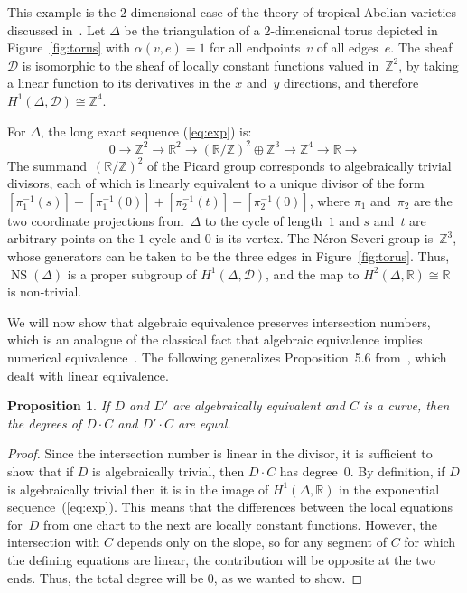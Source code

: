 \documentclass[11pt]{amsart}
\newtheorem{prop}[thm]{Proposition}
\theoremstyle{definition}
\newcommand{\cD}{\mathcal D}
\newcommand{\isom}{\cong}
\newcommand{\NS}{\operatorname{NS}}
\newcommand{\RR}{\mathbb R}
\newcommand{\ZZ}{\mathbb Z}
\begin{document}
\begin{ex}\label{ex:torus}
This example is the $2$-dimensional case of the theory of tropical Abelian
varieties discussed in~\cite[Section~5.1]{mikhalkin-zharkov}.
Let $\Delta$ be the triangulation of a $2$-dimensional torus depicted in
Figure~\ref{fig:torus} with $\alpha(v,e) = 1$ for all endpoints~$v$ of all
edges~$e$. The sheaf $\cD$ is isomorphic to the sheaf of locally constant
functions valued in~$\ZZ^2$, by taking a linear function to its
derivatives in the $x$ and~$y$ directions, and therefore $H^1(\Delta, \cD) \isom
\ZZ^4$.

For $\Delta$, the long exact sequence (\ref{eq:exp}) is:
\begin{equation*}
0 \rightarrow
\ZZ^2 \rightarrow \RR^2 \rightarrow (\RR/\ZZ)^2 \oplus \ZZ^3 \rightarrow
\ZZ^4 \rightarrow \RR \rightarrow
\end{equation*}
The summand~$(\RR/\ZZ)^2$ of the Picard
group corresponds to algebraically trivial divisors, each of which is linearly
equivalent to a unique divisor of the form
$[\pi_1^{-1}(s)] - [\pi_1^{-1}(0)] + [\pi_2^{-1}(t)] - [\pi_2^{-1}(0)]$,
where $\pi_1$ and~$\pi_2$ are the two coordinate projections
from~$\Delta$ to the cycle of length~$1$ and
$s$ and~$t$ are arbitrary points on the $1$-cycle and
$0$ is its vertex. The N\'eron-Severi group is~$\ZZ^3$, whose
generators can be taken to be the three edges in Figure~\ref{fig:torus}.
Thus, $\NS(\Delta)$ is a proper
subgroup of $H^1(\Delta, \cD)$, and the map to $H^2(\Delta, \RR)
\isom \RR$ is non-trivial.
\end{ex}


We will now show that algebraic equivalence preserves intersection numbers,
which is an analogue of the classical fact that algebraic equivalence implies
numerical equivalence~\cite[p.~374]{fulton-intersection}. The following
generalizes Proposition~5.6 from~\cite{cartwright-complexes}, which dealt with
linear equivalence.

\begin{prop}\label{prop:intersect-alg}
If $D$ and $D'$ are algebraically equivalent and $C$ is a curve, then the
degrees of $D \cdot C$ and $D' \cdot C$ are equal.
\end{prop}

\begin{proof}
Since the intersection number is linear in the divisor, it is sufficient to show
that if $D$ is algebraically trivial, then $D \cdot C$ has degree~$0$.
By definition, if $D$ is algebraically trivial then it is in the image of
$H^1(\Delta, \RR)$ in the exponential sequence~(\ref{eq:exp}). This means that
the differences between the local equations for~$D$ from one chart to the next
are locally constant functions. However, the intersection with $C$ depends only
on the slope, so for any segment of $C$ for which the defining equations are
linear, the contribution will be opposite at the two ends. Thus, the total
degree will be $0$, as we wanted to show.
\end{proof}
\end{document}
